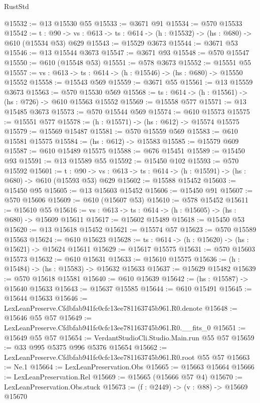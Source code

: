 \begin{lexlean}{RustStd}
\begin{coremodule}
@15532 := @13 @15530 @55
@15533 := @3671 @91
@15534 := @570 @15533
@15542 := {t : @90} ->
  {vs : @613} -> {ts : @614} -> (h : @15532) -> (hs : @680) -> @610 (@15534 @53) @629
@15543 := @15529 @3673
@15544 := @3671 @53
@15546 := @13 @15544 @3673
@15547 := @3671 @93
@15548 := @570 @15547
@15550 := @610 (@15548 @53)
@15551 := @578 @3673
@15552 := @15551 @55
@15557 := {vs : @613} -> {ts : @614} -> (h : @15546) -> (hs : @680) -> @15550 @15552
@15558 := @15543 @569
@15559 := @3671 @55
@15561 := @13 @15559 @3673
@15563 := @570 @15530 @569
@15568 := {ts : @614} -> (h : @15561) -> (hs : @726) -> @610 @15563 @15552
@15569 := @15558 @577
@15571 := @13 @15485 @3673
@15573 := @570 @15544 @569
@15574 := @610 @15573
@15575 := @15551 @577
@15578 := (h : @15571) -> (hs : @612) -> @15574 @15575
@15579 := @15569 @15487
@15581 := @570 @15559 @569
@15583 := @610 @15581 @15575
@15584 := (hs : @612) -> @15583
@15585 := @15579 @609
@15587 := @610 @15489 @15575
@15588 := @676 @15451
@15589 := @15450 @93
@15591 := @13 @15589 @55
@15592 := @15450 @102
@15593 := @570 @15592
@15601 := {t : @90} ->
  {vs : @613} -> {ts : @614} -> (h : @15591) -> (hs : @680) -> @610 (@15593 @53) @629
@15602 := @15588 @15452
@15603 := @15450 @95
@15605 := @13 @15603 @15452
@15606 := @15450 @91
@15607 := @570 @15606
@15609 := @610 (@15607 @53)
@15610 := @578 @15452
@15611 := @15610 @55
@15616 := {vs : @613} -> {ts : @614} -> (h : @15605) -> (hs : @680) -> @15609 @15611
@15617 := @15602 @15489
@15618 := @15450 @53
@15620 := @13 @15618 @15452
@15621 := @15574 @57
@15623 := @570 @15589 @15563
@15624 := @610 @15623
@15628 := {ts : @614} -> (h : @15620) -> (hs : @15621) -> @15624 @15611
@15629 := @15617 @15575
@15631 := @570 @15603 @15573
@15632 := @610 @15631
@15633 := @15610 @15575
@15636 := (h : @15484) -> (hs : @15583) -> @15632 @15633
@15637 := @15629 @15482
@15639 := @570 @15618 @15581
@15640 := @610 @15639
@15642 := (hs : @15587) -> @15640 @15633
@15643 := @15637 @15585
@15644 := @610 @15491
@15645 := @15644 @15633
@15646 := LexLeanPreserve.Cfdbfab941fc0cfc13ee781163745b961.R0.denote
@15648 := @15646 @55 @57
@15649 := LexLeanPreserve.Cfdbfab941fc0cfc13ee781163745b961.R0.__fits_0
@15651 := @15649 @55 @57
@15654 := VerdantStudioCli.Studio.Main.run @55 @57
@15659 := @33 @995 @5375 @996 @5376 @15654
@15662 := LexLeanPreserve.Cfdbfab941fc0cfc13ee781163745b961.R0.root @55 @57
@15663 := Ne.{1}
@15664 := LexLeanPreservation.Obs
@15665 := @15663 @15664
@15666 := LexLeanPreservation.Rel
@15669 := @15665 (@15666 @57 @4)
@15670 := LexLeanPreservation.Obs.stuck
@15673 := (f : @2449) -> (v : @88) -> @15669 @15670

\end{coremodule}
\end{lexlean}
